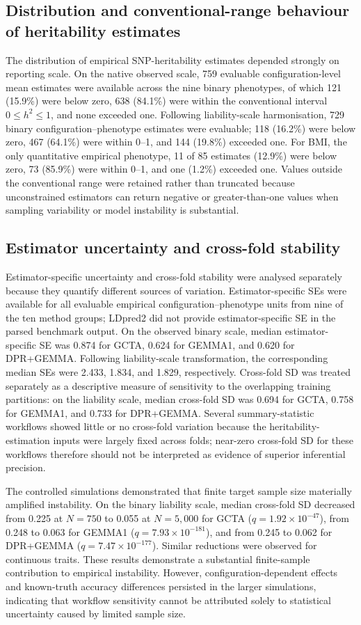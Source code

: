 \subsection{Distribution and conventional-range behaviour of heritability estimates}

The distribution of empirical SNP-heritability estimates depended strongly on reporting scale. On the native observed scale, 759 evaluable configuration-level mean estimates were available across the nine binary phenotypes, of which 121 (15.9\%) were below zero, 638 (84.1\%) were within the conventional interval $0\leq h^2\leq1$, and none exceeded one. Following liability-scale harmonisation, 729 binary configuration--phenotype estimates were evaluable; 118 (16.2\%) were below zero, 467 (64.1\%) were within 0--1, and 144 (19.8\%) exceeded one. For BMI, the only quantitative empirical phenotype, 11 of 85 estimates (12.9\%) were below zero, 73 (85.9\%) were within 0--1, and one (1.2\%) exceeded one. Values outside the conventional range were retained rather than truncated because unconstrained estimators can return negative or greater-than-one values when sampling variability or model instability is substantial.

\subsection{Estimator uncertainty and cross-fold stability}

Estimator-specific uncertainty and cross-fold stability were analysed separately because they quantify different sources of variation. Estimator-specific SEs were available for all evaluable empirical configuration--phenotype units from nine of the ten method groups; LDpred2 did not provide estimator-specific SE in the parsed benchmark output. On the observed binary scale, median estimator-specific SE was 0.874 for GCTA, 0.624 for GEMMA1, and 0.620 for DPR+GEMMA. Following liability-scale transformation, the corresponding median SEs were 2.433, 1.834, and 1.829, respectively. Cross-fold SD was treated separately as a descriptive measure of sensitivity to the overlapping training partitions: on the liability scale, median cross-fold SD was 0.694 for GCTA, 0.758 for GEMMA1, and 0.733 for DPR+GEMMA. Several summary-statistic workflows showed little or no cross-fold variation because the heritability-estimation inputs were largely fixed across folds; near-zero cross-fold SD for these workflows therefore should not be interpreted as evidence of superior inferential precision.

The controlled simulations demonstrated that finite target sample size materially amplified instability. On the binary liability scale, median cross-fold SD decreased from 0.225 at $N=750$ to 0.055 at $N=5{,}000$ for GCTA ($q=1.92\times10^{-47}$), from 0.248 to 0.063 for GEMMA1 ($q=7.93\times10^{-181}$), and from 0.245 to 0.062 for DPR+GEMMA ($q=7.47\times10^{-177}$). Similar reductions were observed for continuous traits. These results demonstrate a substantial finite-sample contribution to empirical instability. However, configuration-dependent effects and known-truth accuracy differences persisted in the larger simulations, indicating that workflow sensitivity cannot be attributed solely to statistical uncertainty caused by limited sample size.